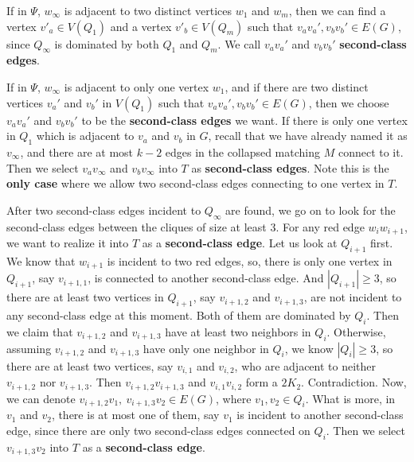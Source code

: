 \documentclass{amsart}
\begin{document}
If in $\Psi$, $w_{\infty}$ is adjacent to two distinct vertices $w_1$ and $w_m$, then we can find a vertex $v'_a\in V(Q_1)$ and a vertex $v'_b\in V(Q_m)$ such that $v_av_a',v_bv_b'\in E(G)$, since $Q_{\infty}$ is dominated by both $Q_1$ and $Q_m$. We call $v_av_a'$ and $v_bv_b'$ {\bf second-class edges}.

If in $\Psi$, $w_{\infty}$ is adjacent to only one vertex $w_1$, and if there are two distinct vertices $v_a'$ and $v_b'$ in $V(Q_1)$ such that $v_av_a',v_bv_b'\in E(G)$, then we choose $v_av_a'$ and $v_bv_b'$ to be the {\bf second-class edges} we want. If there is only one vertex in $Q_1$ which is adjacent to $v_a$ and $v_b$ in $G$, recall that we have already named it as $v_{\infty}$, and there are at most $k-2$ edges in the collapsed matching $M$ connect to it. Then we select $v_av_{\infty}$ and $v_bv_{\infty}$ into $T$ as {\bf second-class edges}. Note this is the {\bf only case} where we allow two second-class edges connecting to one vertex in $T$.





After two second-class edges incident to $Q_{\infty}$ are found, we go on to look for the second-class edges between the cliques of size at least 3.
For any red edge $w_iw_{i+1}$, we want to realize it into $T$ as a {\bf second-class edge}. Let us look at $Q_{i+1}$ first. We know that $w_{i+1}$ is incident to two red edges, so, there is only one vertex in $Q_{i+1}$, say $v_{i+1,1}$, is connected to another second-class edge. And $|Q_{i+1}|\ge3$, so there are at least two vertices in $Q_{i+1}$, say $v_{i+1,2}$ and $v_{i+1,3}$, are not incident to any second-class edge at this moment. Both of them are dominated by $Q_i$. Then we claim that $v_{i+1,2}$ and $v_{i+1,3}$ have at least two neighbors in $Q_i$. Otherwise, assuming $v_{i+1,2}$ and $v_{i+1,3}$ have only one neighbor in $Q_i$, we know $|Q_i|\ge3$, so there are at least two vertices, say $v_{i,1}$ and $v_{i,2}$, who are adjacent to neither $v_{i+1,2}$ nor $v_{i+1,3}$. Then $v_{i+1,2}v_{i+1,3}$ and $v_{i,1}v_{i,2}$ form a $2K_2$. Contradiction. Now, we can denote $v_{i+1,2}v_1,~v_{i+1,3}v_2\in E(G)$, where $v_1,v_2\in Q_i$. What is more, in $v_1$ and $v_2$, there is at most one of them, say $v_1$ is incident to another second-class edge, since there are only two second-class edges connected on $Q_i$. Then we select $v_{i+1,3}v_2$ into $T$ as a {\bf second-class edge}.
\end{document}
